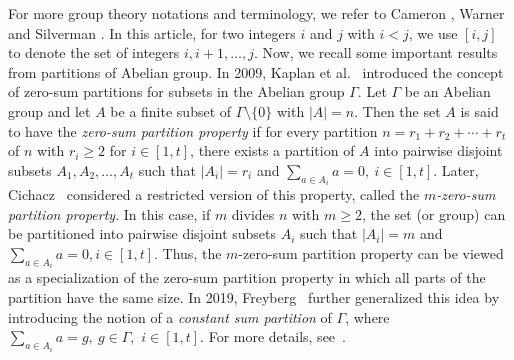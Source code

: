 \documentclass[preprint,11pt]{elsarticle}
\begin{document}
For more group theory  notations and terminology, we refer to Cameron \cite{zbMATH05233000}, Warner\cite{MR1068318} and Silverman \cite{MR4423367}. In this article, for two integers $i$ and $j$ with $i<j$, we use $[i,j]$ to denote the set of integers $i,i+1,\ldots, j$. Now, 
we recall some important results from partitions of Abelian group.  In 2009, Kaplan et al.~\cite{MR2510327} introduced the concept of zero-sum partitions for subsets in the Abelian group $\Gamma$.
Let $\Gamma$ be an Abelian group and let $A$ be a finite subset of $\Gamma\setminus\{0\}$ with $|A|=n$.  
Then the set $A$ is said to have the \emph{zero-sum partition property} if for every partition
\(
n = r_1 + r_2 + \cdots + r_t
\)
of $n$ with $r_i \ge 2$ for $i \in [1,t]$, there exists a partition of $A$ into pairwise disjoint subsets
$A_1,A_2,\dots,A_t$ such that $|A_i|=r_i$ and
\(
  \sum_{a\in A_i} a = 0, ~  i \in [1,t].
\) Later, Cichacz~\cite{MR3761934} considered a  restricted version of this property, called the \emph{$m$-zero-sum partition property}. 
In this case, if $m$ divides $n$ with $m\ge 2$, the set (or group) can be partitioned into pairwise disjoint subsets $A_i$ such that $|A_i|=m$ and
\(
  \sum_{a\in A_i} a = 0 ,  i \in [1,t].
\)
Thus, the $m$-zero-sum partition property can be viewed as a specialization of the zero-sum partition property in which all parts of the partition have the same size. In 2019, Freyberg~\cite{MR4145425} further generalized this idea by introducing the notion of a \emph{constant sum partition} of $\Gamma$, where
\(
 \sum_{a \in A_i} a = g, ~g \in \Gamma,
\) $i \in [1,t]$. 
For more details, see~\cite{MR3720542,MR2313123,MR3418508}.

\end{document}
